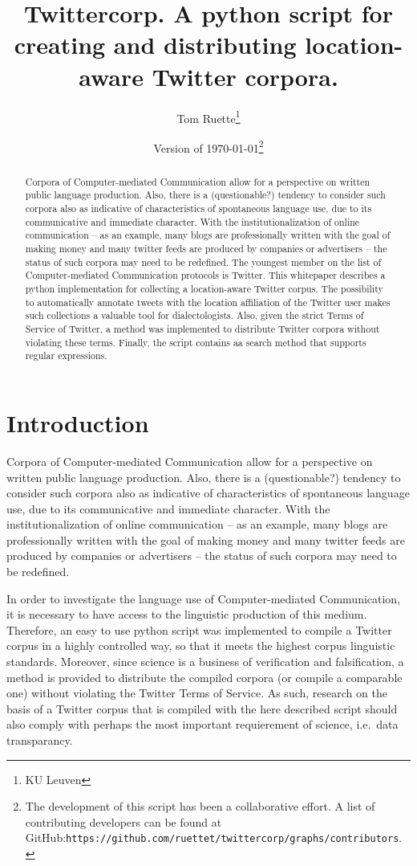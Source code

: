 \documentclass[a4paper,11pt]{article}
\title{Twittercorp. A python script for creating and distributing location-aware Twitter corpora.}
\author{Tom Ruette\thanks{KU Leuven}}
\date{Version of \today\thanks{The development of this script has been a collaborative effort. A list of contributing developers can be found at GitHub:\newline \texttt{https://github.com/ruettet/twittercorp/graphs/contributors}.}}
\begin{document}
\maketitle

\begin{abstract}
Corpora of Computer-mediated Communication allow for a perspective on written public language production. Also, there is a (questionable?) tendency to consider such corpora also as indicative of characteristics of spontaneous language use, due to its communicative and immediate character. With the institutionalization of online communication -- as an example, many blogs are professionally written with the goal of making money and many twitter feeds are produced by companies or advertisers -- the status of such corpora may need to be redefined. The youngest member on the list of Computer-mediated Communication protocols is Twitter. This whitepaper describes a python implementation for collecting a location-aware Twitter corpus. The possibility to automatically annotate tweets with the location affiliation of the Twitter user makes such collections a valuable tool for dialectologists. Also, given the strict Terms of Service of Twitter, a method was implemented to distribute Twitter corpora without violating these terms. Finally, the script contains aa search method that supports regular expressions.
\end{abstract}

\section{Introduction}

Corpora of Computer-mediated Communication allow for a perspective on written public language production. Also, there is a (questionable?) tendency to consider such corpora also as indicative of characteristics of spontaneous language use, due to its communicative and immediate character. With the institutionalization of online communication -- as an example, many blogs are professionally written with the goal of making money and many twitter feeds are produced by companies or advertisers -- the status of such corpora may need to be redefined.

In order to investigate the language use of Computer-mediated Communication, it is necessary to have access to the linguistic production of this medium. Therefore, an easy to use python script was implemented to compile a Twitter corpus in a highly controlled way, so that it meets the highest corpus linguistic standards. Moreover, since science is a business of verification and falsification, a method is provided to distribute the compiled corpora (or compile a comparable one) without violating the Twitter Terms of Service. As such, research on the basis of a Twitter corpus that is compiled with the here described script should also comply with perhaps the most important requierement of science, i.e.~data transparancy.
\end{document}
